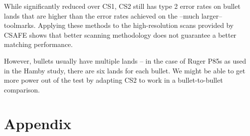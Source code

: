 \documentclass[12pt]{article}
\begin{document}
While significantly reduced over CS1, CS2 still has type 2 error rates
on bullet lands that are higher than the error rates achieved on the
--much larger-- toolmarks. Applying these methods to the high-resolution
scans provided by CSAFE shows that better scanning methodology does not
guarantee a better matching performance.

However, bullets usually have multiple lands -- in the case of Ruger
P85s as used in the Hamby study, there are six lands for each bullet. We
might be able to get more power out of the test by adapting CS2 to work
in a bullet-to-bullet comparison.

\hypertarget{appendix}{%
\section*{Appendix}\label{appendix}}
\end{document}
